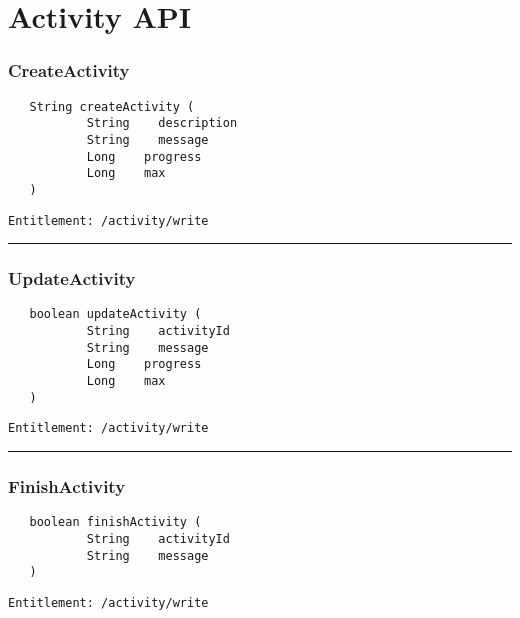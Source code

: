 \chapter{Activity API}

\subsection{CreateActivity}
\label{Api:CreateActivity}
\begin{Verbatim}
   String createActivity (
           String    description
           String    message
           Long    progress
           Long    max
   )
\end{Verbatim}
\begin{Verbatim}[formatcom=\color{Maroon}]
  Entitlement: /activity/write
\end{Verbatim}



\rule{12cm}{2pt}
\subsection{UpdateActivity}
\label{Api:UpdateActivity}
\begin{Verbatim}
   boolean updateActivity (
           String    activityId
           String    message
           Long    progress
           Long    max
   )
\end{Verbatim}
\begin{Verbatim}[formatcom=\color{Maroon}]
  Entitlement: /activity/write
\end{Verbatim}



\rule{12cm}{2pt}
\subsection{FinishActivity}
\label{Api:FinishActivity}
\begin{Verbatim}
   boolean finishActivity (
           String    activityId
           String    message
   )
\end{Verbatim}
\begin{Verbatim}[formatcom=\color{Maroon}]
  Entitlement: /activity/write
\end{Verbatim}



